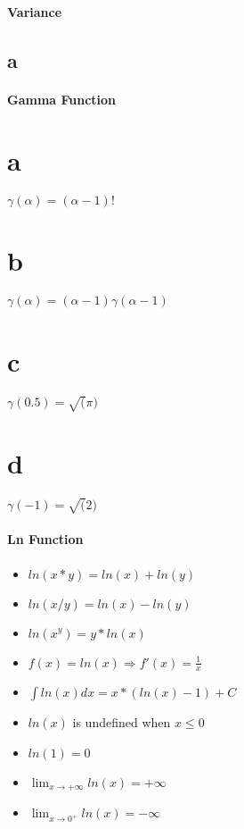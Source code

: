 \documentclass[12pt]{article}
\begin{document}
\subsection{Variance}
\begin{itemize}
\part{a} 
\end{itemize}
\subsection{Gamma Function}
\begin{itemize}
\part{a} $\gamma(\alpha)=(\alpha-1)!$
\part{b} $\gamma(\alpha)=(\alpha-1)\gamma(\alpha-1)$
\part{c} $\gamma(0.5)=\sqrt(\pi)$
\part{d} $\gamma(-1)=\sqrt(2)$
\end{itemize}
\subsection{Ln Function}
\begin{itemize}
\item $ln(x*y)=ln(x)+ln(y)$
\item $ln(x/y)=ln(x)-ln(y)$
\item $ln(x^y)=y*ln(x)$
\item $f(x)=ln(x) \Rightarrow f'(x)=\frac{1}{x}$
\item $\int ln(x)dx=x*(ln(x)-1)+C$
\item $ln(x)$ is undefined when $x \leq 0$
\item $ln(1)=0$
\item $\displaystyle \lim_{x \to +\infty} ln(x)=+\infty$
\item $\displaystyle \lim_{x \rightarrow 0^{+}} ln(x)=-\infty$
\end{itemize}
\end{document}
